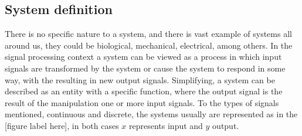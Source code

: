 \subsection{System definition}\label{subsec:SysDef}
There is no specific nature to a system, and there is vast example of systems all around us, they could be biological, mechanical, electrical, among others. In the signal processing context a system can be viewed as a process in which input signals are transformed by the system or cause the system to respond in some way, with the resulting in new output signals. Simplifying, a system can be described as an entity with a specific function, where the output signal is the result of the manipulation one or more input signals.
To the types of signals mentioned, continuous and discrete, the systems usually are represented as in the [figure label here], in both cases $x$ represents input and $y$ output.



